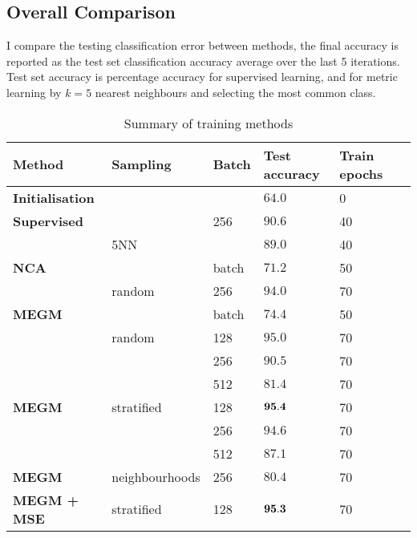 \subsection{Overall Comparison}

I compare the testing classification error between methods, the final accuracy
is reported as the test set classification accuracy average over the last 5 iterations.
Test set accuracy is percentage accuracy for supervised learning, and for metric
learning by $k = 5$ nearest neighbours and selecting the most common class.




\begin{table*}[ht]

\centering
  \caption{Summary of training methods}

  \begin{tabular}{  l l  l  l l l }
  
    \toprule
    Method &  Sampling & Batch  & Test accuracy &  Train epochs \\  \hline
    \bf{Initialisation} & &  &  $ 64.0  $ & 0  &  \\  
    \hline
    
    \bf{Supervised} & & 256 &  $ 90.6  $ & 40  &  \\  
     & 5NN  &  &  $ 89.0  $ & 40 &  \\  
     \hline
    
    \bf{NCA} &  & batch &  $  71.2  $ &  50  & \\
     & random & 256 & $  94.0  $ & 70 & \\
    
    \hline
    
    \bf{MEGM} &  & batch  &  $  74.4  $ &  50  & \\
     & random & 128 &  $  95.0  $ &  70  & \\     
     &  & 256 & $  90.5  $ &  70 & \\  
     &  & 512 & $  81.4  $ &  70 & \\
    
    \hline
    \bf{MEGM} & stratified & 128 & $  {\bf 95.4 }  $ & 70 & \\  
    
     &  & 256 & $  94.6  $ & 70 & \\  
     &  & 512 & $  87.1  $ & 70 & \\  

     \hline
     
    \bf{MEGM} & neighbourhoods & 256 & $  80.4  $ & 70  & \\
    
    \hline
    
    \bf{MEGM + MSE} & stratified & 128 & $  {\bf 95.3 }  $ & 70  & \\

      \bottomrule
    
    \end{tabular}
\label{fig:metric_summary}
\end{table*}



